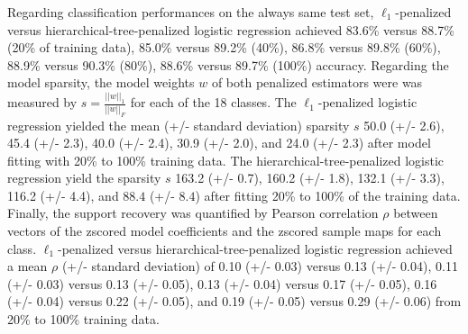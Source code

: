 \documentclass{article}
\begin{document}
Regarding classification performances on the always same test set,
$\ell_1$-penalized versus hierarchical-tree-penalized logistic regression
achieved
83.6\% versus 88.7\% (20\% of training data),
85.0\% versus 89.2\% (40\%),
86.8\% versus 89.8\% (60\%),
88.9\% versus 90.3\% (80\%),
88.6\% versus 89.7\% (100\%) accuracy.
Regarding the model sparsity,
the model weights $w$ of both penalized estimators were
was measured by $s = \frac{||w||_1}{||w||_F}$ for each of the 18 classes.
The $\ell_1$-penalized logistic regression
yielded the mean (+/- standard deviation) sparsity $s$ 
50.0 (+/- 2.6), 45.4 (+/- 2.3), 40.0 (+/- 2.4), 30.9 (+/- 2.0), and 24.0 (+/- 2.3)
after model fitting with 20\% to 100\% training data.
The hierarchical-tree-penalized logistic regression
yield the sparsity $s$ 
163.2 (+/- 0.7), 160.2 (+/- 1.8), 132.1 (+/- 3.3), 116.2 (+/- 4.4), and $88.4$ (+/- $8.4$)
after fitting 20\% to 100\% of the training data.
Finally, the support recovery was quantified by
Pearson correlation $\rho$ between vectors of
the zscored model coefficients
and
the zscored sample maps for each class.
$\ell_1$-penalized versus hierarchical-tree-penalized logistic regression
achieved a mean $\rho$ (+/- standard deviation) of
0.10 (+/- 0.03) versus 0.13 (+/- 0.04),
0.11 (+/- 0.03) versus 0.13 (+/- 0.05),
0.13 (+/- 0.04) versus 0.17 (+/- 0.05),
0.16 (+/- 0.04) versus 0.22 (+/- 0.05), and
0.19 (+/- 0.05) versus 0.29 (+/- 0.06)
from 20\% to 100\% training data.
\end{document}
